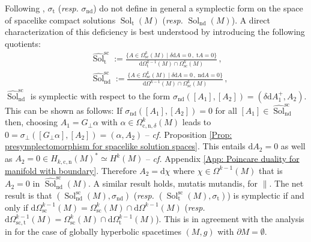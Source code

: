 \begin{remark}\label{Rmk: on degeneracy on presymplectic structure}
	Following \cite[Cor. 5.3]{Hack-Schenkel-13}, $\sigma_{\mathrm{t}}$ (\textit{resp.} $\sigma_{\mathrm{nd}}$) do not define in general a symplectic form on the space of spacelike compact solutions $\operatorname{Sol}_{\mathrm{t}}(M)$ (\textit{resp.} $\operatorname{Sol}_{\mathrm{nd}}(M)$).
	A direct characterization of this deficiency is best understood  by introducing the following quotients:
	\begin{align}
	&\widehat{\operatorname{Sol}}_{\mathrm{t}}^{\mathrm{sc}}:=
	\frac{\lbrace A\in\Omega^k_{\mathrm{sc}}(M)\;|\;\delta\mathrm{d}A=0\,,\;\mathrm{t}A=0\rbrace}
	{\mathrm{d}\Omega_{\mathrm{t}}^{k-1}(M)\cap\Omega^k_{\mathrm{sc}}(M)}\,,\\
	&\widehat{\operatorname{Sol}}_{\mathrm{nd}}^{\mathrm{sc}}:=
	\frac{\lbrace A\in\Omega^k_{\mathrm{sc}}(M)\;|\;\delta\mathrm{d}A=0\,,\;\mathrm{nd}A=0\rbrace}
	{\mathrm{d}\Omega^{k-1}(M)\cap\Omega^k_{\mathrm{sc}}(M)}\,,
	\end{align}
$\widehat{\operatorname{Sol}}_{\mathrm{nd}}^{\mathrm{sc}}$ is symplectic with respect to the form $\sigma_{\mathrm{nd}}([A_1],[A_2])=(\delta\mathrm{d}A_1^+,A_2)$.
	This can be shown as follows: If $\sigma_{\mathrm{nd}}([A_1],[A_2])=0$ for all $[A_1]\in\widehat{\operatorname{Sol}}_{\mathrm{nd}}^{\mathrm{sc}}$ then, choosing $A_1=G_\perp\alpha$ with $\alpha\in\Omega^k_{\mathrm{c,n},\delta}(M)$ leads to $0=\sigma_\perp([G_\perp\alpha],[A_2])=(\alpha,A_2)$ -- \textit{cf.} Proposition \ref{Prop: presymplectomorphism for spacelike solution spaces}.
	This entails $\mathrm{d}A_2=0$ as well as $A_2=0\in H_{k,\mathrm{c,n}}(M)^*\simeq H^k(M)$ -- \textit{cf.} Appendix \ref{App: Poincare duality for manifold with boundary}.
	Therefore $A_2=\mathrm{d}\chi$ where $\chi\in\Omega^{k-1}(M)$ that is $A_2=0$ in $\widehat{\operatorname{Sol}}_{\mathrm{nd}}^{\mathrm{sc}}(M)$.
	A similar result holds, mutatis mutandis, for $\parallel$.
	The net result is that $(\operatorname{Sol}_{\mathrm{nd}}^{\mathrm{sc}}(M),\sigma_{\mathrm{nd}})$ (\textit{resp.} $(\operatorname{Sol}_{\mathrm{t}}^{\mathrm{sc}}(M),\sigma_{\mathrm{t}})$) is symplectic if and only if  $\mathrm{d}\Omega^{k-1}_{\mathrm{sc}}(M)=\Omega^k_{\mathrm{sc}}(M)\cap\mathrm{d}\Omega^{k-1}(M)$ (\textit{resp.} $\mathrm{d}\Omega^{k-1}_{\mathrm{sc,t}}(M)=\Omega^k_{\mathrm{sc}}(M)\cap\mathrm{d}\Omega_{\mathrm{t}}^{k-1}(M)$).
	This is in agreement with the analysis in \cite{Benini:2013tra} for the case of globally hyperbolic spacetimes $(M,g)$ with $\partial M=\emptyset$.
\end{remark}

